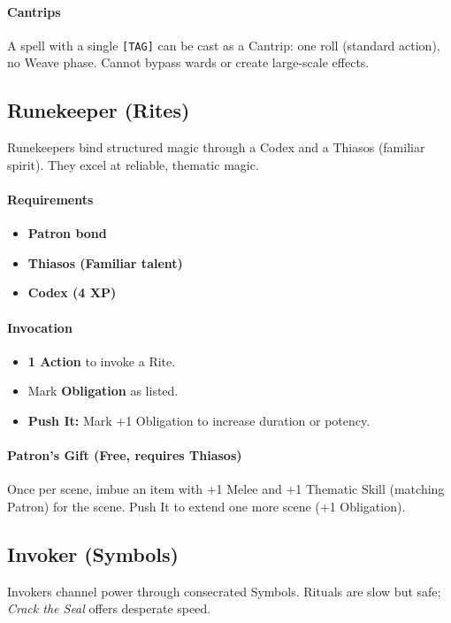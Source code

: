 \paragraph{Cantrips}
A spell with a single \texttt{[TAG]} can be cast as a Cantrip: one roll (standard action), no Weave phase. Cannot bypass wards or create large-scale effects.

\subsection{Runekeeper (Rites)}

Runekeepers bind structured magic through a Codex and a Thiasos (familiar spirit). They excel at reliable, thematic magic.

\paragraph{Requirements}
\begin{itemize}
  \item \textbf{Patron bond}
  \item \textbf{Thiasos (Familiar talent)}
  \item \textbf{Codex (4 XP)}
\end{itemize}

\paragraph{Invocation}
\begin{itemize}
  \item \textbf{1 Action} to invoke a Rite.
  \item Mark \textbf{Obligation} as listed.
  \item \textbf{Push It:} Mark +1 Obligation to increase duration or potency.
\end{itemize}

\paragraph{Patron's Gift (Free, requires Thiasos)}
Once per scene, imbue an item with +1 Melee and +1 Thematic Skill (matching Patron) for the scene. Push It to extend one more scene (+1 Obligation).

\subsection{Invoker (Symbols)}

Invokers channel power through consecrated Symbols. Rituals are slow but safe; \emph{Crack the Seal} offers desperate speed.

